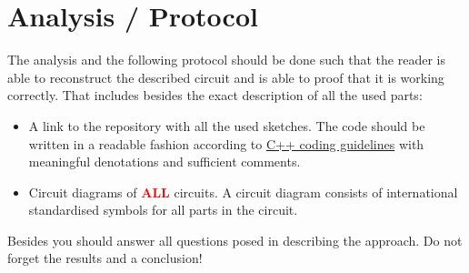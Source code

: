 \section{Analysis / Protocol}

The analysis and the following protocol should be done such that the reader is able to reconstruct the described circuit and is able to proof that it is working correctly. That includes besides the exact description of all the used parts:

\begin{itemize}
	\item A link to the repository with all the used sketches. The code should be written in a readable fashion according to \href{https://gist.github.com/lefticus/10191322}{C++ coding guidelines} with meaningful denotations and sufficient comments.
	\item Circuit diagrams of \textcolor{red}{\textbf{ALL}} circuits. A circuit diagram consists of international standardised symbols for all parts in the circuit.
\end{itemize}

\noindent
Besides you should answer all questions posed in  describing the approach. Do not forget the results and a conclusion!










